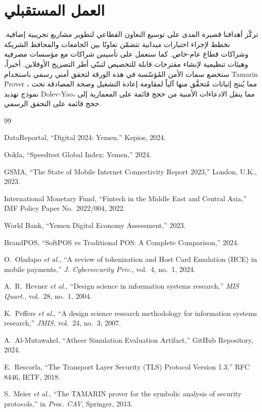 \documentclass[12pt,a4paper]{article}
\begin{document}
\section{العمل المستقبلي}
تركّز أهدافنا قصيرة المدى على توسيع التعاون القطاعي لتطوير مشاريع تجريبية إضافية. نخطط لإجراء اختبارات ميدانية تتضمّن تعاونًا بين الجامعات والمحافظ الشريكة وشراكات قطاع عام-خاص. كما سنعمل على تأسيس شراكات مع مؤسسات مصرفية وهيئات تنظيمية لإنشاء مقترحات قابلة للتخصيص لتبنّي أطر التصريح الأوفلاين. أخيراً، ستخضع سمات الأمن المُؤسّسة في هذه الورقة لتحقق أمني رسمي باستخدام Tamarin Prover \cite{meier2013}، مما يُنتج إثباتات مُتحقَّق منها آلياً لمقاومة إعادة التشغيل وصحة المصادقة تحت نموذج تهديد Dolev-Yao، مما ينقل الادعاءات الأمنية من حجج قائمة على المعمارية إلى حجج قائمة على التحقق الرسمي.

\begin{thebibliography}{99}

DataReportal, ``Digital 2024: Yemen,'' Kepios, 2024.

Ookla, ``Speedtest Global Index: Yemen,'' 2024.

GSMA, ``The State of Mobile Internet Connectivity Report 2023,'' London, U.K., 2023.

International Monetary Fund, ``Fintech in the Middle East and Central Asia,'' IMF Policy Paper No.~2022/004, 2022.

World Bank, ``Yemen Digital Economy Assessment,'' 2023.

BrandPOS, ``SoftPOS vs Traditional POS: A Complete Comparison,'' 2024.

O.~Oladapo \emph{et al.}, ``A review of tokenization and Host Card Emulation (HCE) in mobile payments,'' \emph{J. Cybersecurity Priv.}, vol.~4, no.~1, 2024.

A.~R.~Hevner \emph{et al.}, ``Design science in information systems research,'' \emph{MIS Quart.}, vol.~28, no.~1, 2004.

K.~Peffers \emph{et al.}, ``A design science research methodology for information systems research,'' \emph{JMIS}, vol.~24, no.~3, 2007.

A.~Al-Mutawakel, ``Atheer Simulation Evaluation Artifact,'' GitHub Repository, 2024.

E.~Rescorla, ``The Transport Layer Security (TLS) Protocol Version 1.3,'' RFC 8446, IETF, 2018.

S.~Meier \emph{et al.}, ``The TAMARIN prover for the symbolic analysis of security protocols,'' in \emph{Proc. CAV}, Springer, 2013.

\end{thebibliography}
\end{document}
